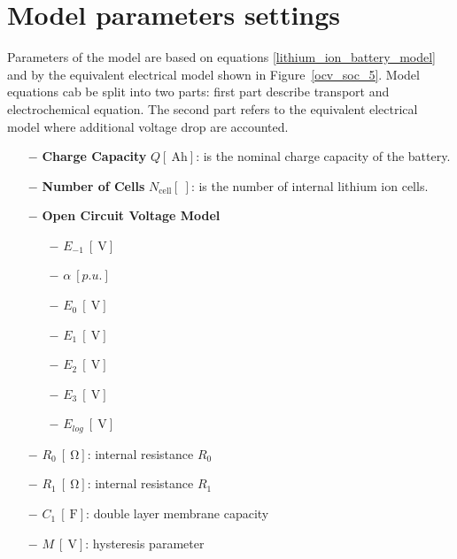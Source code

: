 \documentclass[11pt,a4paper]{article}
\numberwithin{equation}{section}
\theoremstyle{it}
\theoremstyle{definition}
\begin{document}
\section{Model parameters settings}
Parameters of the model are based on equations \eqref{lithium_ion_battery_model} and by the equivalent electrical model shown in Figure~\ref{ocv_soc_5}. Model equations cab be split into two parts: first part describe transport and electrochemical equation. The second part refers to the equivalent electrical model where additional voltage drop are accounted. 
\begin{itemize}
	\item[$-$] \textbf{Charge Capacity} $Q[\SI{}{\ampere\hour}]$: is the nominal charge capacity of the battery.
	\item[$-$] \textbf{Number of Cells} $N_\text{cell}[\SI{}{}]$: is the number of internal lithium ion cells.
	\item[$-$] \textbf{Open Circuit Voltage Model} 
	\begin{itemize}
		\item[$-$] $E_{-1}\ [\SI{}{\volt}]$
		\item[$-$] $\alpha\ [p.u.]$
		\item[$-$] $E_{0}\ [\SI{}{\volt}]$
		\item[$-$] $E_{1}\ [\SI{}{\volt}]$
		\item[$-$] $E_{2}\ [\SI{}{\volt}]$
		\item[$-$] $E_{3}\ [\SI{}{\volt}]$
		\item[$-$] $E_{log}\ [\SI{}{\volt}]$
	\end{itemize}
	\item[$-$] $R_{0}\ [\SI{}{\ohm}]$: internal resistance $R_0$
	\item[$-$] $R_{1}\ [\SI{}{\ohm}]$: internal resistance $R_1$
	\item[$-$] $C_{1}\ [\SI{}{\farad}]$: double layer membrane capacity
	\item[$-$] $M\ [\SI{}{\volt}]$: hysteresis parameter
\end{itemize}
\end{document}
